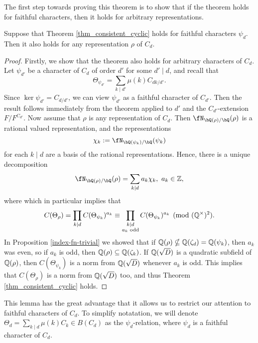The first step towards proving this theorem is to show that if the theorem holds for faithful characters, then it holds for arbitrary representations. 

\begin{lemma}
    Suppose that Theorem \ref{thm_consistent_cyclic} holds for faithful characters $\psi_d$. Then it also holds for any representation $\rho$ of $C_d$.
\end{lemma}
\begin{proof}
    Firstly, we show that the theorem also holds for arbitrary characters of $C_d$. Let $\psi_{d'}$ be a character of $C_d$ of order $d'$ for some $d'\mid d$, and recall that 
    $$\Theta_{\psi_{d'}}=\sum_{k\mid d'}\mu(k)C_{dk/d'}.$$ Since $\ker\psi_{d'}=C_{d/d'}$, we can view $\psi_{d'}$ as a faithful character of $C_{d'}$. Then the result follows immediately from the theorem applied to ${d'}$ and the $C_{d'}$-extension $F/F^{C_{d'}}$.
    Now assume that $\rho$ is any representation of $C_d$. Then $\repnorm{\rho}$ is a rational valued representation, and the representations
    $$\chi_k:=\repnorm{\psi_k}$$
    for each $k\mid d$ are a basis of the rational representations. Hence, there is a unique decomposition
    $$\repnorm{\rho}=\sum_{k\mid d}a_k\chi_k,\ a_k\in\ZZ,$$
    where
    which in particular implies that 
    $$C(\Theta_\rho)=\prod_{k\mid d}C(\Theta_{\psi_k})^{a_k}\equiv \prod_{\substack{k\mid d \\ a_k\text{ odd}} }C(\Theta_{\psi_k})^{a_k}\pmod{(\mathbb{Q}^{\times})^2}.$$
    In Proposition \ref{index-fn-trivial} we showed that if $\mathbb{Q}(\rho)\nsubseteq \mathbb{Q}(\zeta_d)=\mathbb{Q}(\psi_k)$, then $a_k$ was even, so if $a_k$ is odd, then $\mathbb{Q}(\rho)\subseteq\mathbb{Q}(\zeta_k)$. If $\mathbb{Q}(\sqrt{D})$ is a quadratic subfield of $\mathbb{Q}(\rho)$, then $C(\Theta_{\psi_k})$ is a norm from $\mathbb{Q}(\sqrt{D})$ whenever $a_k$ is odd. This implies that $C(\Theta_\rho)$ is a norm from $\mathbb{Q}(\sqrt{D})$ too, and thus Theorem \ref{thm_consistent_cyclic} holds.
\end{proof}

This lemma has the great advantage that it allows us to restrict our attention to faithful characters of $C_d$. To simplify notatation, we will denote $\Theta_d=\sum_{k\mid d}\mu(k)C_k\in B(C_d)$ as the $\psi_d$-relation, where $\psi_d$ is a faithful character of $C_d$.

